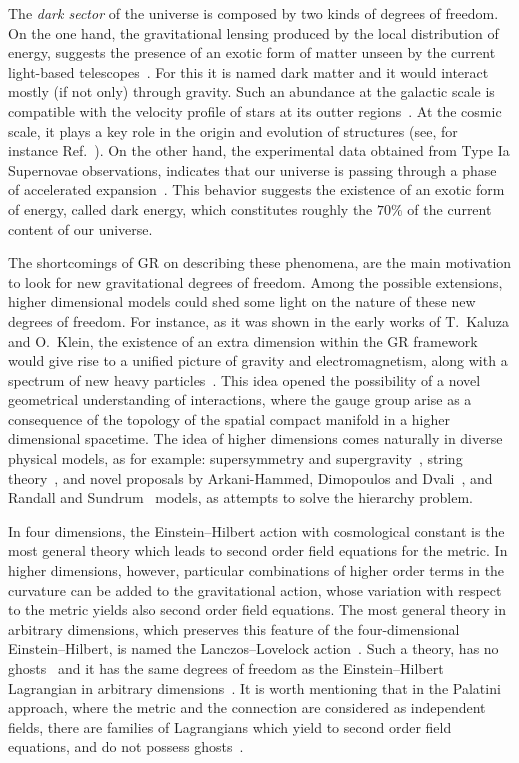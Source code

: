 \documentclass[aps,prd,12pt,superscriptaddress,showpacs,showkeys,reprint,nofootinbib]{revtex4-1}
\begin{document}
The \emph{dark sector} of the universe is composed by two kinds of degrees of freedom. On the one hand, the gravitational lensing produced by the local distribution of energy, suggests the presence of an exotic form of matter unseen by the current light-based telescopes~\cite{Wittman:2000tc}. For this it is named dark matter and it would interact mostly (if not only) through gravity. Such an abundance at the galactic scale is compatible with the velocity profile of stars at its outter regions~\cite{Sofue:2000jx}. At the cosmic scale, it plays a key role in the origin and evolution of structures (see, for instance Ref.~\cite{DelPopolo:2008mr}). On the other hand, the experimental data obtained from Type Ia Supernovae observations, indicates that our universe is passing through a phase of accelerated expansion~\cite{Riess:1998cb}. This behavior suggests the existence of an exotic form of energy, called dark energy, which constitutes roughly the $70\%$ of the current content of our universe.  

The shortcomings of GR on describing these phenomena, are the main motivation to look for new gravitational degrees of freedom. Among the possible extensions, higher dimensional models could shed some light on the nature of these new degrees of freedom. For instance, as it was shown in the early works of T.~Kaluza and O.~Klein, the existence of an extra dimension within the GR framework would give rise to a unified picture of gravity and electromagnetism, along with a spectrum of new heavy particles~\cite{Kaluza:1921tu,*Klein:1926tv}. This idea opened the possibility of a novel geometrical understanding of interactions, where the gauge group arise as a consequence of the topology of the spatial compact manifold in a higher dimensional spacetime. The idea of higher dimensions comes naturally in diverse physical models, as for example: supersymmetry and supergravity~\cite{supergravity}, string theory~\cite{Green:1987sp,*Green:1987mn}, and novel proposals by Arkani-Hammed, Dimopoulos and Dvali~\cite{ArkaniHamed:1998rs,*Antoniadis:1998ig}, and Randall and Sundrum~\cite{Randall:1999ee,*Randall:1999vf} models, as attempts to solve the hierarchy problem.

In four dimensions, the Einstein--Hilbert action with cosmological
constant is the most general theory which leads to second order field
equations for the metric. In higher dimensions, however, particular
combinations of higher order terms in the curvature can be added to
the gravitational action, whose variation with respect to the metric
yields also second order field equations. The most general theory in
arbitrary dimensions, which preserves this feature of the
four-dimensional Einstein--Hilbert, is named the Lanczos--Lovelock
action~\cite{Lanczos:1938sf,*Lovelock:1971yv}. Such a theory, has no
ghosts~\cite{Zumino:1985dp} and it has the same degrees of freedom as
the Einstein--Hilbert Lagrangian in arbitrary
dimensions~\cite{Henneaux:1990au}. It is worth mentioning that in the
Palatini approach, where the metric and the connection are considered
as independent fields, there are families of Lagrangians which yield
to second order field equations, and do not possess
ghosts~\cite{Olmo:2011uz}.
\end{document}
